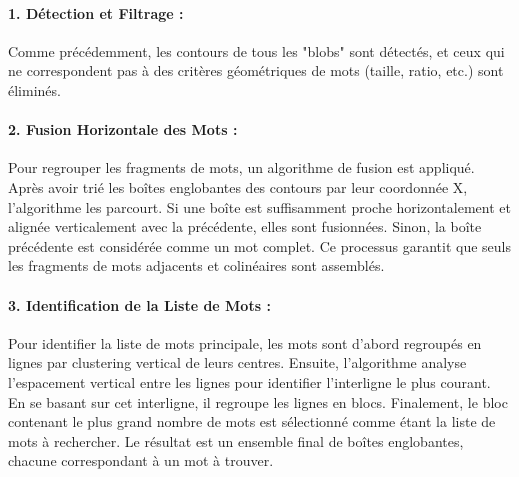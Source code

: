 \documentclass{article}
\begin{document}
\paragraph{1. Détection et Filtrage :} Comme précédemment, les contours de tous les "blobs" sont détectés, et ceux qui ne correspondent pas à des critères géométriques de mots (taille, ratio, etc.) sont éliminés.

\paragraph{2. Fusion Horizontale des Mots :} Pour regrouper les fragments de mots, un algorithme de fusion est appliqué. Après avoir trié les boîtes englobantes des contours par leur coordonnée X, l'algorithme les parcourt. Si une boîte est suffisamment proche horizontalement et alignée verticalement avec la précédente, elles sont fusionnées. Sinon, la boîte précédente est considérée comme un mot complet. Ce processus garantit que seuls les fragments de mots adjacents et colinéaires sont assemblés.

\paragraph{3. Identification de la Liste de Mots :} Pour identifier la liste de mots principale, les mots sont d'abord regroupés en lignes par clustering vertical de leurs centres. Ensuite, l'algorithme analyse l'espacement vertical entre les lignes pour identifier l'interligne le plus courant. En se basant sur cet interligne, il regroupe les lignes en blocs. Finalement, le bloc contenant le plus grand nombre de mots est sélectionné comme étant la liste de mots à rechercher. Le résultat est un ensemble final de boîtes englobantes, chacune correspondant à un mot à trouver.
\end{document}
